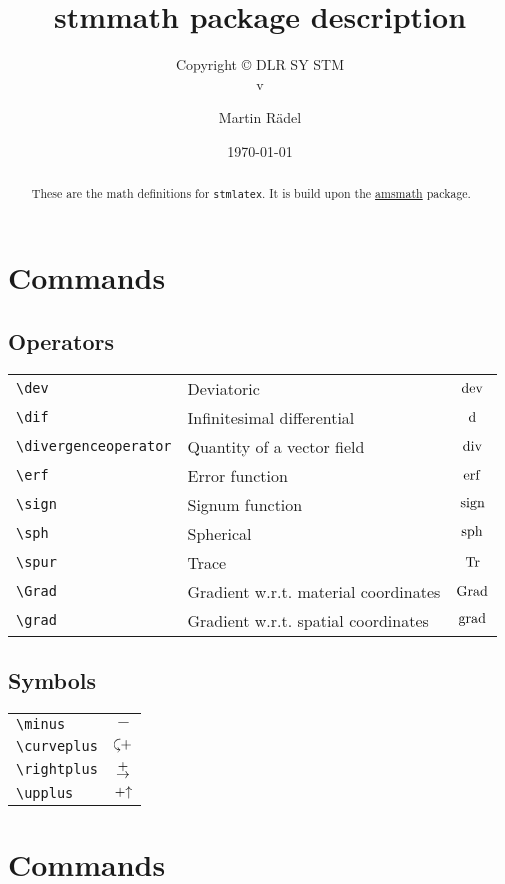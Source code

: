 \documentclass[%
  type=article,%
  layout=koma,%
  date=true,%
  hyperref=true,%
  listings=true,%
  math=true,%
]{stmtext}
\author{Martin R\"{a}del}
\title{stmmath package description}
\subtitle{Copyright \copyright{} \the\year{} DLR SY STM\\v\formatdate[versiondatestyle]{\DTMToday}}
\date{\today}
\begin{document}
\maketitle

\begin{abstract}
These are the math definitions for \texttt{stmlatex}. It is build upon the \href{https://ctan.org/pkg/amsmath}{amsmath} package.
\end{abstract}

\tableofcontents

\section{Commands}

\subsection{Operators}

\begin{tabularx}{\linewidth}{lXc}
\verb+\dev+ & Deviatoric & $\operatorname{dev}$\\
\verb+\dif+ & Infinitesimal differential & $\mathop{}\!\mathrm{d}$\\
\verb+\divergenceoperator+ & Quantity of a vector field & $\operatorname{div}$\\
\verb+\erf+ & Error function & $\operatorname{erf}$\\
\verb+\sign+ & Signum function & $\operatorname{sign}$\\
\verb+\sph+ & Spherical & $\operatorname{sph}$\\
\verb+\spur+ & Trace & $\operatorname{Tr}$\\
\verb+\Grad+ & Gradient w.r.t. material coordinates & $\operatorname{Grad}$\\
\verb+\grad+ & Gradient w.r.t. spatial coordinates & $\operatorname{grad}$
\end{tabularx}

\subsection{Symbols}

\begin{tabularx}{\linewidth}{Xc}
\verb+\minus+ & $\minus$\\
\verb+\curveplus+ & $\curveplus$\\
\verb+\rightplus+ & $\rightplus$\\
\verb+\upplus+ & $\mathbin{+\mathord\uparrow}$
\end{tabularx}

\section{Commands}
\end{document}
